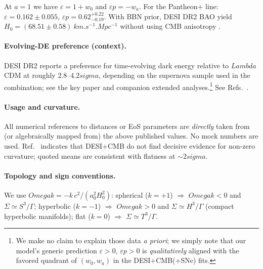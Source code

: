 \documentclass[aps,prd,twocolumn,amsmath,amssymb,nofootinbib,superscriptaddress]{revtex4-2}
\def\Ok{Omega k}%
\def\Lambda{Lambda}%
\def\Omega{Omega}\def\sigma{sigma}\def\chi{chi}\def\ell{ell}%
\newcommand{\Ok}{\Omega_k}
\begin{document}
At $a=1$ we have $\varepsilon=1+w_0$ and $\varepsilon p=-w_a$. For the Pantheon$+$ line: $\varepsilon=0.162\pm0.055$, $\varepsilon p=0.62^{+0.22}_{-0.19}$. With BBN prior, DESI DR2 BAO yield $H_0=(68.51\pm0.58)\ \si{km.s^{-1}.Mpc^{-1}}$ without using CMB anisotropy \cite{DESI_DR2_BAO}.

\paragraph{Evolving-DE preference (context).}
DESI DR2 reports a preference for time-evolving dark energy relative to $\Lambda$CDM at roughly $2.8\text{--}4.2\sigma$, depending on the supernova sample used in the combination; see the key paper and companion extended analyses.\footnote{We make no claim to explain those data \emph{a priori}; we simply note that our model’s generic prediction $\varepsilon>0$, $\varepsilon p>0$ is \emph{qualitatively} aligned with the favored quadrant of $(w_0,w_a)$ in the DESI+CMB(+SNe) fits.} See Refs.~\cite{DESI_DR2_BAO,DESI_DR2_ExtendedDE}.

\paragraph{Usage and curvature.}
All numerical references to distances or EoS parameters are \emph{directly} taken from (or algebraically mapped from) the above published values. No mock numbers are used. Ref.~\cite{DESI_DR2_BAO} indicates that DESI+CMB do not find decisive evidence for non-zero curvature; quoted means are consistent with flatness at $\sim2\sigma$.

\paragraph{Topology and sign conventions.}
We use $\Ok=-k\,c^2/(a_0^2H_0^2)$: spherical ($k=+1$) $\Rightarrow$ $\Ok<0$ and $\Sigma\simeq S^3/\Gamma$; hyperbolic ($k=-1$) $\Rightarrow$ $\Ok>0$ and $\Sigma\simeq H^3/\Gamma$ (compact hyperbolic manifolds); flat ($k=0$) $\Rightarrow$ $\Sigma\simeq T^3/\Gamma$.
\end{document}
